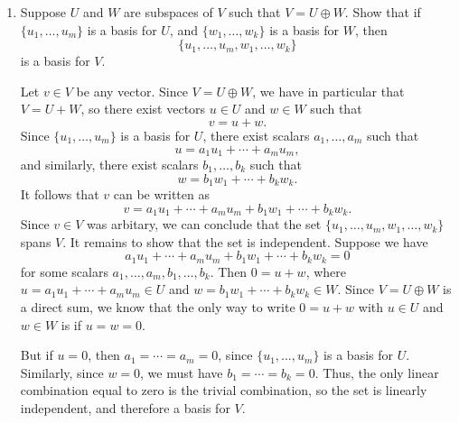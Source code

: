 \documentclass[12pt]{article}
\newcommand{\points}[1]{\marginpar{\hspace{24pt}[#1]}}
\begin{document}
\begin{enumerate}
\newpage

\item Suppose $U$ and $W$ are subspaces of $V$ such that $V=U\oplus W$. Show that if $\{u_1,\ldots, u_m\}$ is a basis for $U$, and $\{w_1,\ldots, w_k\}$ is a basis for $W$, then \points{10}
\[
 \{u_1,\ldots, u_m,w_1,\ldots, w_k\}
\]
is a basis for $V$.

\bigskip

Let $v\in V$ be any vector. Since $V=U\oplus W$, we have in particular that $V=U+W$, so there exist vectors $u\in U$ and $w\in W$ such that
\[
 v=u+w.
\]
Since $\{u_1,\ldots, u_m\}$ is a basis for $U$, there exist scalars $a_1,\ldots, a_m$ such that
\[
 u=a_1u_1+\cdots +a_mu_m,
\]
and similarly, there exist scalars $b_1,\ldots, b_k$ such that
\[
 w = b_1w_1+\cdots +b_kw_k.
\]
It follows that $v$ can be written as
\[
 v= a_1u_1+\cdots + a_mu_m + b_1w_1+\cdots + b_kw_k.
\]
Since $v\in V$ was arbitary, we can conclude that the set $\{u_1,\ldots, u_m, w_1,\ldots, w_k\}$ spans $V$. It remains to show that the set is independent. Suppose we have
\[
 a_1u_1+\cdots + a_mu_m + b_1w_1+\cdots + b_kw_k=0
\]
for some scalars $a_1,\ldots, a_m,b_1,\ldots,b_k$. Then $0=u+w$, where $u=a_1u_1+\cdots +a_mu_m\in U$ and $w = b_1w_1+\cdots +b_kw_k\in W$. Since $V=U\oplus W$ is a direct sum, we know that the only way to write $0=u+w$ with $u\in U$ and $w\in W$ is if $u=w=0$.

But if $u=0$, then $a_1=\cdots =a_m=0$, since $\{u_1,\ldots, u_m\}$ is a basis for $U$. Similarly, since $w=0$, we must have $b_1=\cdots=b_k=0$. Thus, the only linear combination equal to zero is the trivial combination, so the set is linearly independent, and therefore a basis for $V$.
 \end{enumerate}
\end{document}
